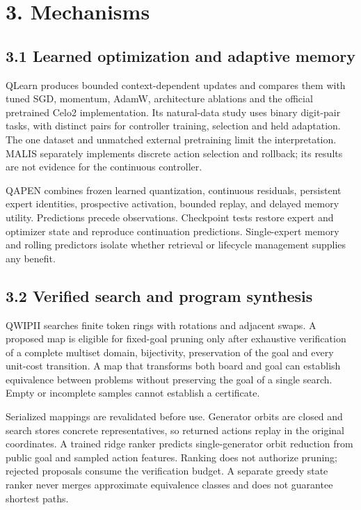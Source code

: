 \documentclass[
]{article}
\begin{document}
\section{3. Mechanisms}\label{mechanisms}

\subsection{3.1 Learned optimization and adaptive
memory}\label{learned-optimization-and-adaptive-memory}

QLearn produces bounded context-dependent updates and compares them with
tuned SGD, momentum, AdamW, architecture ablations and the official
pretrained Celo2 implementation. Its natural-data study uses binary
digit-pair tasks, with distinct pairs for controller training, selection
and held adaptation. The one dataset and unmatched external pretraining
limit the interpretation. MALIS separately implements discrete action
selection and rollback; its results are not evidence for the continuous
controller.

QAPEN combines frozen learned quantization, continuous residuals,
persistent expert identities, prospective activation, bounded replay,
and delayed memory utility. Predictions precede observations. Checkpoint
tests restore expert and optimizer state and reproduce continuation
predictions. Single-expert memory and rolling predictors isolate whether
retrieval or lifecycle management supplies any benefit.

\subsection{3.2 Verified search and program
synthesis}\label{verified-search-and-program-synthesis}

QWIPII searches finite token rings with rotations and adjacent swaps. A
proposed map is eligible for fixed-goal pruning only after exhaustive
verification of a complete multiset domain, bijectivity, preservation of
the goal and every unit-cost transition. A map that transforms both
board and goal can establish equivalence between problems without
preserving the goal of a single search. Empty or incomplete samples
cannot establish a certificate.

Serialized mappings are revalidated before use. Generator orbits are
closed and search stores concrete representatives, so returned actions
replay in the original coordinates. A trained ridge ranker predicts
single-generator orbit reduction from public goal and sampled action
features. Ranking does not authorize pruning; rejected proposals consume
the verification budget. A separate greedy state ranker never merges
approximate equivalence classes and does not guarantee shortest paths.
\end{document}
